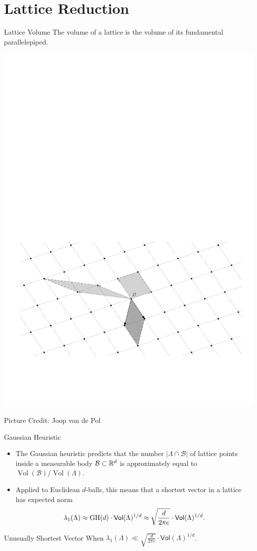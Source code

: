 \documentclass[table,10pt,aspectratio=169]{beamer}
\DeclareMathOperator{\Vol}{Vol}
\begin{document}
\section{Lattice Reduction}
\label{sec:org8751273}
\begin{frame}[label={sec:orgd7cc1f0}]{Lattice Volume}
The volume of a lattice is the volume of its fundamental parallelepiped.

\begin{center}
\includegraphics[width=0.8\linewidth]{./assets/lattice-volume.pdf}
\end{center}

\tiny Picture Credit: Joop van de Pol
\end{frame}

\begin{frame}[label={sec:org49962e3}]{Gaussian Heuristic}
\begin{itemize}
\item The Gaussian heuristic predicts that the number \(|\Lambda \cap \mathcal{B}|\) of lattice points inside a measurable body \(\mathcal{B} \subset \mathbb{R}^d\) is approximately equal to \(\Vol(\mathcal{B}) / \Vol(\Lambda)\).
\item Applied to Euclidean \(d\)-balls, this means that a shortest vector in a lattice has expected norm \[\lambda_1(\Lambda) \approx \textnormal{GH}(d) \cdot \mathsf{Vol}(\Lambda)^{1/d} \approx \sqrt{\frac{d}{2\pi e}} \cdot \mathsf{Vol}(\Lambda)^{1/d} .\]
\end{itemize}

\begin{block}{Unusually Shortest Vector}
When \(\lambda_1(\Lambda) \ll \sqrt{\frac{d}{2 \pi e}} \cdot \mathsf{Vol}(\Lambda)^{1/d}\).
\end{block}
\end{frame}
\end{document}
